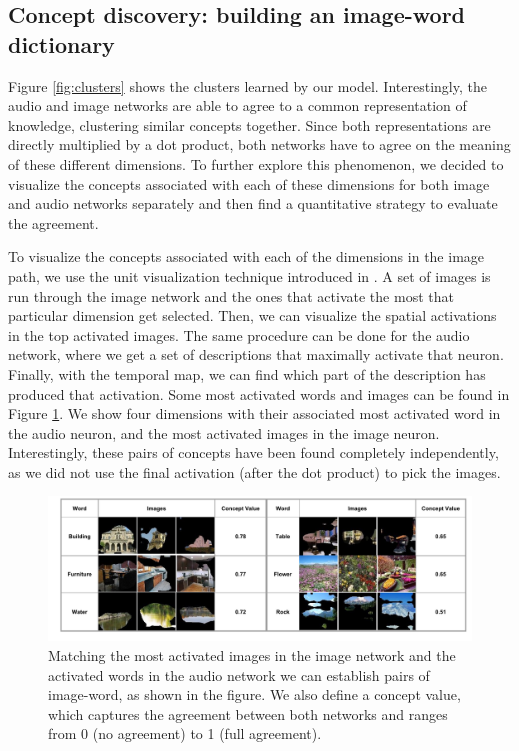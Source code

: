 \subsection{Concept discovery: building an image-word dictionary}
Figure \ref{fig:clusters} shows the clusters learned by our model. Interestingly, the audio and image networks are able to agree to a common representation of knowledge, clustering similar concepts together. Since both representations are directly multiplied by a dot product, both networks have to agree on the meaning of these different dimensions. To further explore this phenomenon, we decided to visualize the concepts associated with each of these dimensions for both image and audio networks separately and then find a quantitative strategy to evaluate the agreement.

To visualize the concepts associated with each of the dimensions in the image path, we use the unit visualization technique introduced in \cite{zhou2014object}. A set of images is run through the image network and the ones that activate the most that particular dimension get selected. Then, we can visualize the spatial activations in the top activated images. The same procedure can be done for the audio network, where we get a set of descriptions that maximally activate that neuron. Finally, with the temporal map, we can find which part of the description has produced that activation. Some most activated words and images can be found in Figure \ref{fig:word_images}. We show four dimensions with their associated most activated word in the audio neuron, and the most activated images in the image neuron. Interestingly, these pairs of concepts have been found completely independently, as we did not use the final activation (after the dot product) to pick the images. 

\begin{figure}
    \includegraphics[width=1\linewidth]{figures/images_paper/word_image}
\vspace{-.3in}
\caption[Image-word concept pairs, with their concept value]{Matching the most activated images in the image network and the activated words in the audio network we can establish pairs of image-word, as shown in the figure. We also define a concept value, which captures the agreement between both networks and ranges from 0 (no agreement) to 1 (full agreement).}
    \label{fig:word_images}
\end{figure}

